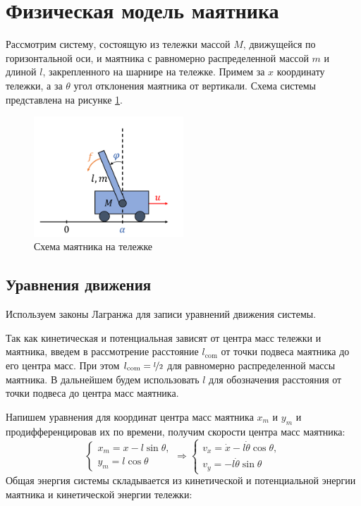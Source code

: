 \section{Физическая модель маятника}

Рассмотрим систему, состоящую из тележки массой $M$, движущейся по горизонтальной оси, и маятника с равномерно распределенной массой $m$ и длиной $l$,
закрепленного на шарнире на тележке. Примем за $x$ координату тележки, а за $\theta$ угол отклонения маятника от вертикали. Схема системы представлена на рисунке \ref{fig:pendulum}.
\begin{figure}[ht!]
    \centering
    \includegraphics[width=0.5\textwidth]{media/cart.png}
    \caption{Схема маятника на тележке}
    \label{fig:pendulum}
\end{figure}

\subsection{Уравнения движения}
Используем законы Лагранжа для записи уравнений движения системы. 

Так как кинетическая и потенциальная зависят от центра масс тележки и маятника, введем в рассмотрение расстояние $l_{\text{com}}$ 
от точки подвеса маятника до его центра масс. При этом $l_{\text{com}} = \nicefrac{l}{2}$ для равномерно распределенной массы маятника.
В дальнейшем будем использовать $l$ для обозначения расстояния от точки подвеса до центра масс маятника. 

Напишем уравнения для координат центра масс маятника $x_m$ и $y_m$ и продифференцировав их по времени, получим скорости центра масс маятника:
\begin{equation}
    \begin{cases}
        x_m = x - l\sin\theta, \\
        y_m = l\cos\theta
    \end{cases} \Rightarrow
    \begin{cases}
        v_x = \dot{x} - l\dot{\theta}\cos\theta, \\
        v_y = -l\dot{\theta}\sin\theta
    \end{cases}
\end{equation}
Общая энергия системы складывается из кинетической и потенциальной энергии маятника и кинетической энергии тележки:

